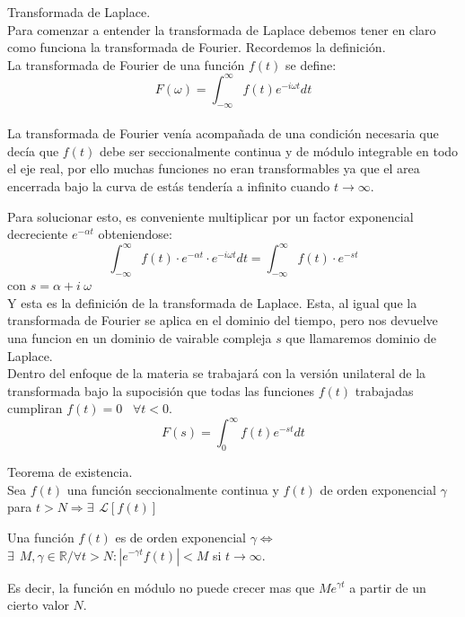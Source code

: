 \documentclass[]{article}
\begin{document}
\huge Transformada de Laplace.
\\

\normalsize Para comenzar a entender la transformada de Laplace debemos tener en claro como funciona la transformada de Fourier. Recordemos la definición.
\\
La transformada de Fourier de una función $f(t)$ se define:
$$
F(\omega) = \int_{-\infty}^{\infty}f(t)e^{-i\omega t} dt 
$$
\\
La transformada de Fourier venía acompañada de una condición necesaria que decía que $f(t)$ debe ser seccionalmente continua y de módulo integrable en todo el eje real, por ello muchas funciones no eran transformables ya que el area encerrada bajo la curva de estás tendería a infinito cuando $t\rightarrow \infty$.

Para solucionar esto, es conveniente multiplicar por un factor exponencial decreciente $e^{-\alpha t }$ obteniendose:
$$
\int_{-\infty}^{\infty} f(t) \cdot  e^{-\alpha t}\cdot  e^{-i\omega t}dt =
\int_{-\infty}^{\infty} f(t) \cdot  e^{-st}
$$
con $s=\alpha + i \hspace{3pt} \omega $
\\ Y esta es la definición de la transformada de Laplace. Esta, al igual que la transformada de Fourier se aplica en el dominio del tiempo, pero nos devuelve una funcion en un dominio de vairable compleja $s$ que llamaremos dominio de Laplace.
\\ Dentro del enfoque de la materia se trabajará con la versión unilateral de la transformada bajo la supocisión que todas las funciones $f(t)$ trabajadas cumpliran 
$f(t) = 0  \hspace{10pt} \forall t < 0$.
$$
F(s) = \int_{0}^{\infty} f(t) e^{-st} dt
$$

\large Teorema de existencia.
\\

\normalsize Sea $f(t)$ una función seccionalmente continua y $f(t)$ de orden exponencial $\gamma$ para $t > N \Rightarrow \exists \hspace{5pt} \mathscr{L}[f(t)]$

Una función $f(t)$ es de orden exponencial $\gamma \Longleftrightarrow$ ${\exists \hspace{5pt} M,\gamma \in \mathbb{R}  / \forall t > N: |e^{-\gamma t} f(t)| < M }$ si $t \rightarrow \infty$.

Es decir, la función en módulo no puede crecer mas que $Me^{\gamma t}$ a partir de un cierto valor $N$.
\end{document}
